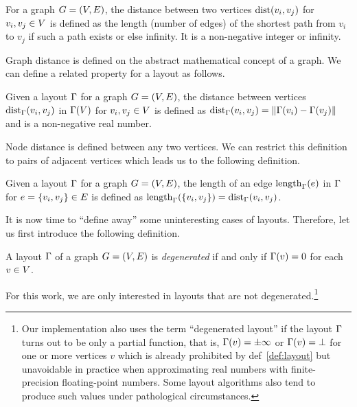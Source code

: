 \documentclass{graphstudy}
\begin{document}
\begin{definition}
  For a graph \(G=(V,E)\), the distance between two vertices \(\operatorname{dist}(v_i,v_j)\) for \(v_i,v_j\in V\) is defined
  as the length (number of edges) of the shortest path from \(v_i\) to \(v_j\) if such a path exists or else infinity.
  It is a non-negative integer or infinity.
  \label{def:graphdist}
\end{definition}

Graph distance is defined on the abstract mathematical concept of a graph.  We can define a related property for a
layout as follows.

\begin{definition}
  Given a layout \(\Gamma\) for a graph \(G=(V,E)\), the distance between vertices \(\operatorname{dist}_\Gamma(v_i,v_j)\) in
  \(\Gamma(V)\) for \(v_i,v_j\in V\) is defined as
  \(\operatorname{dist}_\Gamma(v_i,v_j)=\left\lVert\Gamma(v_i)-\Gamma(v_j)\right\rVert\) and is a non-negative real number.
  \label{def:nodedist}
\end{definition}

Node distance is defined between any two vertices.  We can restrict this definition to pairs of adjacent vertices which
leads us to the following definition.

\begin{definition}
  Given a layout \(\Gamma\) for a graph \(G=(V,E)\), the length of an edge \(\operatorname{length}_\Gamma(e)\) in \(\Gamma\) for
  \(e=\{v_i,v_j\}\in E\) is defined as \(\operatorname{length}_\Gamma(\{v_i,v_j\})=\operatorname{dist}_\Gamma(v_i,v_j)\).
  \label{def:edgelen}
\end{definition}

It is now time to \enquote{define away} some uninteresting cases of layouts.  Therefore, let us first introduce the
following definition.

\begin{definition}
  A layout \(\Gamma\) of a graph \(G=(V,E)\) is \emph{degenerated} if and only if
  \(\Gamma(v)=0\) for each \(v\in V\).
  \label{def:degenerated}
\end{definition}

For this work, we are only interested in layouts that are not degenerated.\footnote{%
  Our implementation also uses the term \enquote{degenerated layout} if the layout \(\Gamma\) turns out to be only a
  partial function, that is, \(\Gamma(v)=\pm\infty\) or \(\Gamma(v)=\bot\) for one or more vertices \(v\) which is
  already prohibited by \acl{def}~\ref{def:layout} but unavoidable in practice when approximating real numbers with
  finite-precision floating-point numbers.  Some layout algorithms also tend to produce such values under pathological
  circumstances.
}
\end{document}
